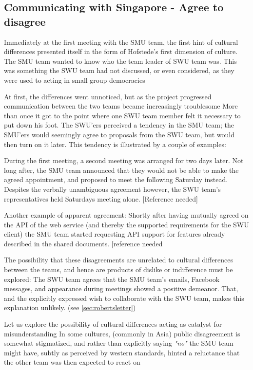 \subsection{Communicating with Singapore - Agree to disagree}
\label{sec:communicating}

Immediately at the first meeting with the SMU team, the  first hint of cultural
differences presented itself in the form of Hofstede's first
dimension of culture\cite{surprises}. The SMU team wanted to know who the team leader of SWU team was.
This was something the SWU team had not discussed, or even considered, as they
were used to acting in small group democracies

At first, the differences went unnoticed, but as the project progressed
communication between the two teams became increasingly troublesome
More than once it got to the point where one SWU team member felt it necessary
to put down his foot\cite{enough}.
The SWU'ers perceived a tendency in the SMU team; the SMU'ers would seemingly
agree to proposals from the SWU team, but would then turn on it later.
This tendency is illustrated by a couple of examples:

During the first meeting, a second meeting was arranged for two
days later. Not long after, the SMU team announced that they would
not be able to make the agreed appointment, and proposed to meet the following
Saturday instead. Despites the verbally unambiguous agreement however,
the SWU team's representatives held Saturdays meeting alone. [Reference needed]

Another example of apparent agreement:
Shortly after having mutually agreed on the API of the web
service (and thereby the supported requirements for the SWU client)
the SMU team started requesting API support for features already
described in the shared documents. [reference needed

The possibility that these disagreements are unrelated to cultural
differences between the teams, and hence are products of dislike or
indifference must be explored: The SWU team agrees that the SMU team's emails, Facebook
messages, and appearance during meetings showed a positive demeanor. That, and
the explicitly expressed wish to collaborate with the SWU team, makes this
explanation unlikely. (see \ref{sec:robertsletter})

Let us explore the possibility of cultural differences acting as catalyst for
misunderstanding
In some cultures, (commonly in Asia) public
disagreement is somewhat \linebreak{}stigmatized\cite{surprises, herbsiemens}, and rather
than explicitly saying \emph{"no"} the SMU team might have, subtly
as perceived by western standards, hinted a reluctance
that the other team was then expected to react on

